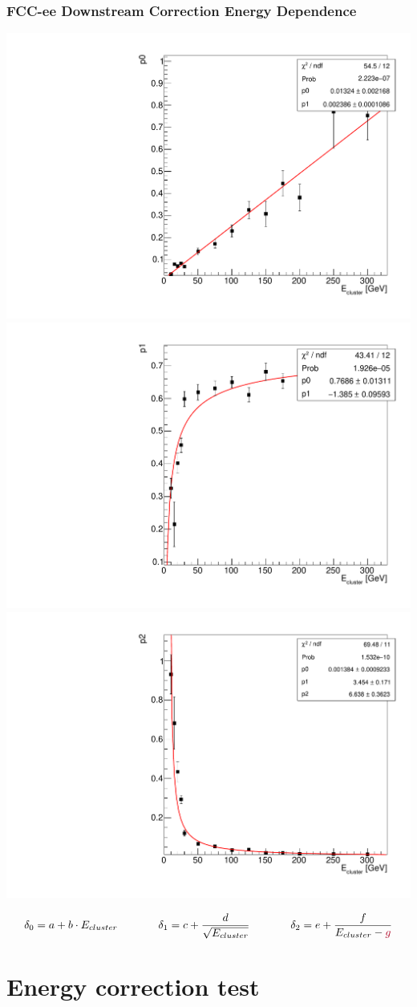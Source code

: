 \documentclass{beamer}
\newcommand{\redtext}[1]{%
  \textcolor{myRed}{#1}
}
\begin{document}
\begin{frame}
  \frametitle{FCC-ee Downstream Correction Energy Dependence}

  \begin{adjustwidth}{-9mm}{-9mm}
    \includegraphics[width=0.32\linewidth]{figures/downstream/graph_downstream_p0.pdf}
    \includegraphics[width=0.32\linewidth]{figures/downstream/graph_downstream_p1.pdf}
    \includegraphics[width=0.32\linewidth]{figures/downstream/graph_downstream_p2.pdf}\\[-3ex]
  \end{adjustwidth}
  \begin{equation*}
    \delta_0 = a + b \cdot E_{cluster}  \hspace{1.3cm}
    \delta_1 = c + \frac{d}{\sqrt{E_{cluster}}} \hspace{1.3cm}
    \delta_2 = e + \frac{f}{E_{cluster} - \redtext{g}}
  \end{equation*}
\end{frame}


\section{Energy correction test}
\end{document}
